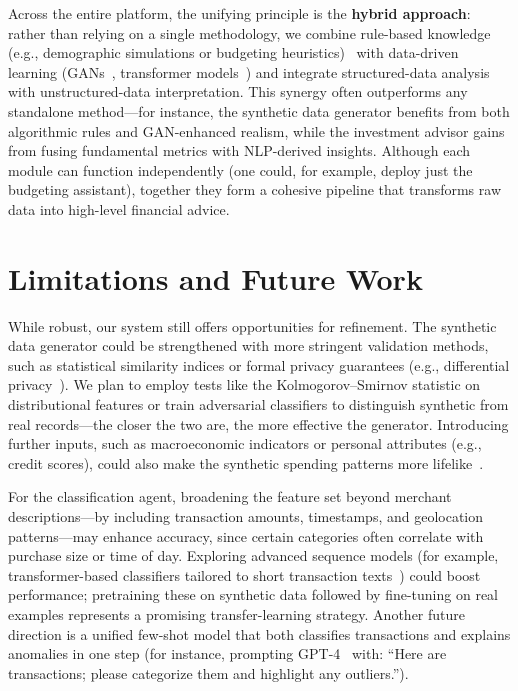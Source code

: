 \documentclass[conference]{IEEEtran}
\begin{document}
Across the entire platform, the unifying principle is the \textbf{hybrid approach}: rather than relying on a single methodology, we combine rule-based knowledge (e.g., demographic simulations or budgeting heuristics)~\cite{acsdata,b8} with data-driven learning (GANs~\cite{ctgan2019}, transformer models~\cite{brown2020,b6}) and integrate structured-data analysis with unstructured-data interpretation. This synergy often outperforms any standalone method—for instance, the synthetic data generator benefits from both algorithmic rules and GAN-enhanced realism, while the investment advisor gains from fusing fundamental metrics with NLP-derived insights. Although each module can function independently (one could, for example, deploy just the budgeting assistant), together they form a cohesive pipeline that transforms raw data into high-level financial advice.



\section*{Limitations and Future Work}

While robust, our system still offers opportunities for refinement. The synthetic data generator could be strengthened with more stringent validation methods, such as statistical similarity indices or formal privacy guarantees (e.g., differential privacy~\cite{eaves2024}). We plan to employ tests like the Kolmogorov–Smirnov statistic on distributional features or train adversarial classifiers to distinguish synthetic from real records—the closer the two are, the more effective the generator. Introducing further inputs, such as macroeconomic indicators or personal attributes (e.g., credit scores), could also make the synthetic spending patterns more lifelike~\cite{acsdata}.

For the classification agent, broadening the feature set beyond merchant descriptions—by including transaction amounts, timestamps, and geolocation patterns—may enhance accuracy, since certain categories often correlate with purchase size or time of day. Exploring advanced sequence models (for example, transformer-based classifiers tailored to short transaction texts~\cite{brown2020}) could boost performance; pretraining these on synthetic data followed by fine-tuning on real examples represents a promising transfer-learning strategy. Another future direction is a unified few-shot model that both classifies transactions and explains anomalies in one step (for instance, prompting GPT-4~\cite{brown2020} with: “Here are transactions; please categorize them and highlight any outliers.”).
\end{document}
